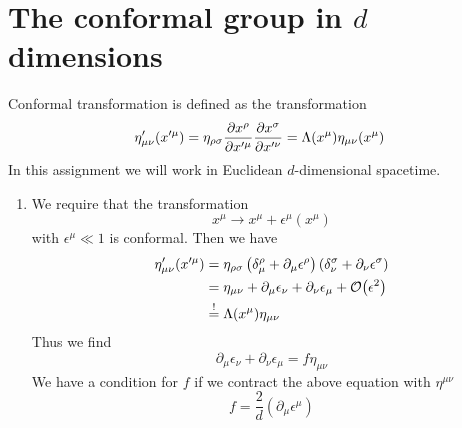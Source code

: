 \section{The conformal group in $d$ dimensions}
Conformal transformation is defined as the transformation 
\begin{equation}
	\eta'_{\mu\nu}(x'^\mu) = \eta_{\rho\sigma} \pdv{x^\rho}{x'^\mu} \pdv{x^\sigma}{x'^\nu} = \Lambda(x^\mu) \eta_{\mu \nu} (x^\mu)
\end{equation}
In this assignment we will work in Euclidean $d$-dimensional spacetime.

\begin{enumerate}
	\item We require that the transformation 
		\begin{equation}
			x^\mu \rightarrow x^\mu + \epsilon^\mu (x^\mu)
		\end{equation}
		with $\epsilon^\mu \ll 1$ is conformal. Then we have
		\begin{align*}
			\eta'_{\mu\nu}(x'^\mu) &= \eta_{\rho\sigma} \left( \delta^\rho_\mu + \partial_\mu \epsilon^\rho \right) \left( \delta_\nu^\sigma + \partial_\nu \epsilon^\sigma \right) \\
										  &= \eta_{\mu\nu} + \partial_\mu \epsilon_\nu + \partial_\nu \epsilon_\mu + \order{\epsilon^2} \\
										  &\stackrel{!}{=} \Lambda(x^\mu) \eta_{\mu\nu}
		\end{align*}
		Thus we find
		\begin{equation}
			\partial_\mu \epsilon_\nu + \partial_\nu \epsilon_\mu = f \eta_{\mu\nu} \label{math:f_eta}
		\end{equation}
		We have a condition for $f$ if we contract the above equation with $\eta^{\mu\nu}$
		\begin{equation}
			f = \frac{2}{d} (\partial_\mu \epsilon^\mu) \label{math:def_f}
		\end{equation}


\end{enumerate}
